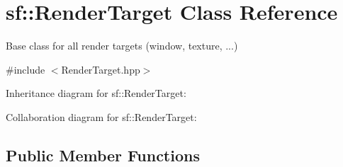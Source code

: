 \hypertarget{classsf_1_1_render_target}{}\section{sf\+:\+:Render\+Target Class Reference}
\label{classsf_1_1_render_target}


Base class for all render targets (window, texture, ...)  




{\ttfamily \#include $<$Render\+Target.\+hpp$>$}



Inheritance diagram for sf\+:\+:Render\+Target\+:


Collaboration diagram for sf\+:\+:Render\+Target\+:
\subsection*{Public Member Functions}
